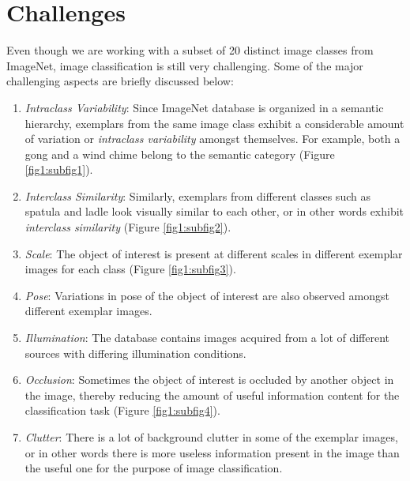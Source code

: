 \documentclass[12pt]{article}
\begin{document}
\section{Challenges}
Even though we are working with a subset of 20 distinct image classes from ImageNet, image classification is still very challenging. Some of the major challenging aspects are briefly discussed below:
\begin{enumerate}
\item \textit{Intraclass Variability}: Since ImageNet database is organized in a semantic hierarchy, exemplars from the same image class exhibit a considerable amount of variation or \textit{intraclass variability} amongst themselves. For example, both a gong and a wind chime belong to the semantic category (Figure \ref{fig1:subfig1}).
\item \textit{Interclass Similarity}: Similarly, exemplars from different classes such as spatula and ladle look visually similar to each other, or in other words exhibit \textit{interclass similarity} (Figure \ref{fig1:subfig2}).
\item \textit{Scale}: The object of interest is present at different scales in different exemplar images for each class (Figure \ref{fig1:subfig3}).
\item \textit{Pose}: Variations in pose of the object of interest are also observed amongst different exemplar images.
\item \textit{Illumination}: The database contains images acquired from a lot of different sources with differing illumination conditions.
\item \textit{Occlusion}: Sometimes the object of interest is occluded by another object in the image, thereby reducing the amount of useful information content for the classification task (Figure \ref{fig1:subfig4}).
\item \textit{Clutter}: There is a lot of background clutter in some of the exemplar images, or in other words there is more useless information present in the image than the useful one for the purpose of image classification.
\end{enumerate}
\end{document}

